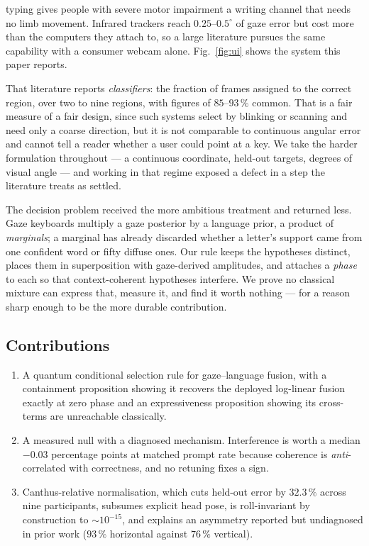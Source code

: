\documentclass[conference]{IEEEtran}
\begin{document}
 typing gives people with severe motor impairment a writing
channel that needs no limb movement. Infrared trackers reach $0.25$--$0.5^\circ$
of gaze error but cost more than the computers they attach to, so a large
literature pursues the same capability with a consumer webcam alone.
Fig.~\ref{fig:ui} shows the system this paper reports.

That literature reports \emph{classifiers}: the fraction of frames assigned to
the correct region, over two to nine regions, with figures of $85$--$93\,\%$
common. That is a fair measure of a fair design, since such systems select by
blinking or scanning and need only a coarse direction, but it is not comparable
to continuous angular error and cannot tell a reader whether a user could point
at a key. We take the harder formulation throughout --- a continuous coordinate,
held-out targets, degrees of visual angle --- and working in that regime exposed
a defect in a step the literature treats as settled.

The decision problem received the more ambitious treatment and returned less.
Gaze keyboards multiply a gaze posterior by a language prior, a product of
\emph{marginals}; a marginal has already discarded whether a letter's support
came from one confident word or fifty diffuse ones. Our rule keeps the
hypotheses distinct, places them in superposition with gaze-derived amplitudes,
and attaches a \emph{phase} to each so that context-coherent hypotheses
interfere. We prove no classical mixture can express that, measure it, and find
it worth nothing --- for a reason sharp enough to be the more durable
contribution.

\subsection{Contributions}

\begin{enumerate}
\item A quantum conditional selection rule for gaze--language fusion, with a
containment proposition showing it recovers the deployed log-linear fusion
exactly at zero phase and an expressiveness proposition showing its
cross-terms are unreachable classically.
\item A measured null with a diagnosed mechanism. Interference is worth a
median $-0.03$ percentage points at matched prompt rate because coherence is
\emph{anti}-correlated with correctness, and no retuning fixes a sign.
\item Canthus-relative normalisation, which cuts held-out error by $32.3\,\%$
across nine participants, subsumes explicit head pose, is roll-invariant by
construction to $\sim$$10^{-15}$, and explains an asymmetry reported but
undiagnosed in prior work ($93\,\%$ horizontal against $76\,\%$ vertical).
\end{enumerate}
\end{document}
